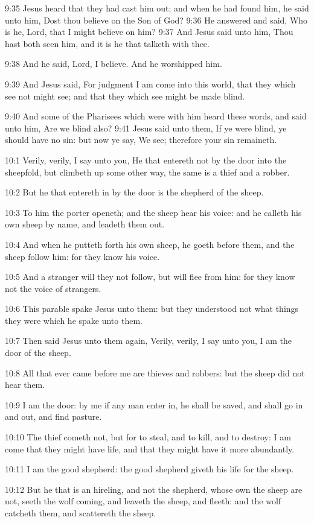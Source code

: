 9:35 Jesus heard that they had cast him out; and when he had found him, he said unto him, Dost thou believe on the Son of God?  9:36 He answered and said, Who is he, Lord, that I might believe on him?  9:37 And Jesus said unto him, Thou hast both seen him, and it is he that talketh with thee.

9:38 And he said, Lord, I believe. And he worshipped him.

9:39 And Jesus said, For judgment I am come into this world, that they which see not might see; and that they which see might be made blind.

9:40 And some of the Pharisees which were with him heard these words, and said unto him, Are we blind also?  9:41 Jesus said unto them, If ye were blind, ye should have no sin: but now ye say, We see; therefore your sin remaineth.

10:1 Verily, verily, I say unto you, He that entereth not by the door into the sheepfold, but climbeth up some other way, the same is a thief and a robber.

10:2 But he that entereth in by the door is the shepherd of the sheep.

10:3 To him the porter openeth; and the sheep hear his voice: and he calleth his own sheep by name, and leadeth them out.

10:4 And when he putteth forth his own sheep, he goeth before them, and the sheep follow him: for they know his voice.

10:5 And a stranger will they not follow, but will flee from him: for they know not the voice of strangers.

10:6 This parable spake Jesus unto them: but they understood not what things they were which he spake unto them.

10:7 Then said Jesus unto them again, Verily, verily, I say unto you, I am the door of the sheep.

10:8 All that ever came before me are thieves and robbers: but the sheep did not hear them.

10:9 I am the door: by me if any man enter in, he shall be saved, and shall go in and out, and find pasture.

10:10 The thief cometh not, but for to steal, and to kill, and to destroy: I am come that they might have life, and that they might have it more abundantly.

10:11 I am the good shepherd: the good shepherd giveth his life for the sheep.

10:12 But he that is an hireling, and not the shepherd, whose own the sheep are not, seeth the wolf coming, and leaveth the sheep, and fleeth: and the wolf catcheth them, and scattereth the sheep.

